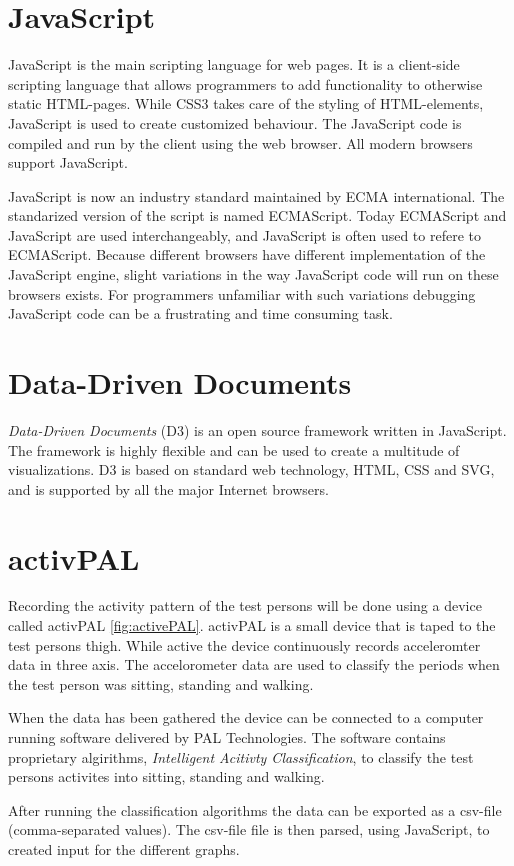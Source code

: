 \section{JavaScript}
JavaScript is the main scripting language for web pages. It is a client-side scripting language that allows programmers to add functionality to otherwise static HTML-pages. While CSS3 takes care of the styling of HTML-elements, JavaScript is used to create customized behaviour. The JavaScript code is compiled and run by the client using the web browser. All modern browsers support JavaScript.

JavaScript is now an industry standard maintained by ECMA international. The standarized version of the script is named ECMAScript. Today ECMAScript and JavaScript are used interchangeably, and JavaScript is often used to refere to ECMAScript. Because different browsers have different implementation of the JavaScript engine, slight variations in the way JavaScript code will run on these browsers exists. For programmers unfamiliar with such variations debugging JavaScript code can be a frustrating and time consuming task.
        
\section{Data-Driven Documents}
\emph{Data-Driven Documents} (D3) is an open source framework written in JavaScript. The framework is highly flexible and can be used to create a multitude of visualizations. D3 is based on standard web technology, HTML, CSS and SVG, and is supported by all the major Internet browsers.

\section{activPAL}
Recording the activity pattern of the test persons will be done using a device called activPAL \ref{fig:activePAL}. activPAL is a small device that is taped to the test persons thigh. While active the device continuously records acceleromter data in three axis. The accelorometer data are used to classify the periods when the test person was sitting, standing and walking.

When the data has been gathered the device can be connected to a computer running software delivered by PAL Technologies. The software contains proprietary algirithms, \emph{Intelligent Acitivty Classification}, to classify the test persons activites into sitting, standing and walking.


After running the classification algorithms the data can be exported as a csv-file (comma-separated values). The csv-file file is then parsed, using JavaScript, to created input for the different graphs.
